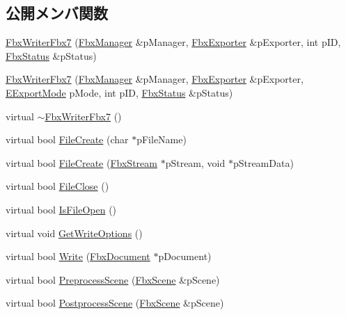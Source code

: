 \subsection*{公開メンバ関数}
\begin{DoxyCompactItemize}
\item 
\hyperlink{class_fbx_writer_fbx7_a288a5fbe6b3236739995790139f71def}{Fbx\+Writer\+Fbx7} (\hyperlink{class_fbx_manager}{Fbx\+Manager} \&p\+Manager, \hyperlink{class_fbx_exporter}{Fbx\+Exporter} \&p\+Exporter, int p\+ID, \hyperlink{class_fbx_status}{Fbx\+Status} \&p\+Status)
\item 
\hyperlink{class_fbx_writer_fbx7_a1ebf15f7ec23f04e86f6121d692d9662}{Fbx\+Writer\+Fbx7} (\hyperlink{class_fbx_manager}{Fbx\+Manager} \&p\+Manager, \hyperlink{class_fbx_exporter}{Fbx\+Exporter} \&p\+Exporter, \hyperlink{class_fbx_writer_fbx7_a07b7bcbb11c9befcbd0eacd265458005}{E\+Export\+Mode} p\+Mode, int p\+ID, \hyperlink{class_fbx_status}{Fbx\+Status} \&p\+Status)
\item 
virtual \hyperlink{class_fbx_writer_fbx7_a116024d4ff2472c4aac86eb6acade7b0}{$\sim$\+Fbx\+Writer\+Fbx7} ()
\item 
virtual bool \hyperlink{class_fbx_writer_fbx7_ab76d4fdd92efb2a6506bde058bfde28e}{File\+Create} (char $\ast$p\+File\+Name)
\item 
virtual bool \hyperlink{class_fbx_writer_fbx7_a0e04e17fe0912786150b2728b76871bf}{File\+Create} (\hyperlink{class_fbx_stream}{Fbx\+Stream} $\ast$p\+Stream, void $\ast$p\+Stream\+Data)
\item 
virtual bool \hyperlink{class_fbx_writer_fbx7_aba83cb046ac5f4154443bdf3bd1503c0}{File\+Close} ()
\item 
virtual bool \hyperlink{class_fbx_writer_fbx7_ad9f82dc72129c63eda20dcccda7db53b}{Is\+File\+Open} ()
\item 
virtual void \hyperlink{class_fbx_writer_fbx7_a881561770b711a6419b45fbe81e4ee94}{Get\+Write\+Options} ()
\item 
virtual bool \hyperlink{class_fbx_writer_fbx7_abc9fcf2cf7e1ed96f87bdc67f05f9545}{Write} (\hyperlink{class_fbx_document}{Fbx\+Document} $\ast$p\+Document)
\item 
virtual bool \hyperlink{class_fbx_writer_fbx7_a0eac2567b63f4fa72b8d1a6c56d5cb1c}{Preprocess\+Scene} (\hyperlink{class_fbx_scene}{Fbx\+Scene} \&p\+Scene)
\item 
virtual bool \hyperlink{class_fbx_writer_fbx7_aa51d7f58358361aaa30835a32fdb17cf}{Postprocess\+Scene} (\hyperlink{class_fbx_scene}{Fbx\+Scene} \&p\+Scene)
\item 

\end{DoxyCompactItemize}
